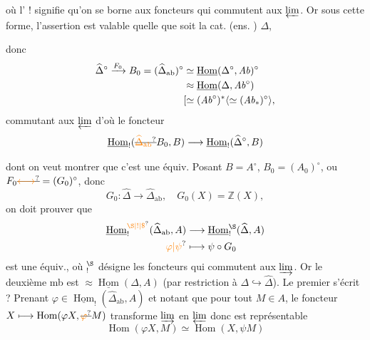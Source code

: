 où l' $!$ signifie qu'on se borne
aux foncteurs qui commutent aux $\varprojlim$.
Or sous cette forme, l'assertion est
valable quelle que soit la cat. (ens. )
$\Delta$, 


donc
\[
\begin{aligned}
\widehat\Delta^{\circ}\xrightarrow{F_0}B_0
=(\widehat\Delta_{\mathrm{ab}})^{\circ}
&\simeq\underline{\operatorname{Hom}}(\Delta^{\circ},\mathit{Ab})^{\circ}\\
&\approx\underline{\operatorname{Hom}}(\Delta,\mathit{Ab}^{\circ})\\
&[\simeq(\mathit{Ab}^{\circ})^{\ast}\inserted{\simeq(\mathit{Ab}_{\ast})^{\circ}},
\end{aligned}
\]
\inserted{dans le cas qui nous intéresse]} commutant aux $\varprojlim$
d'où le foncteur
\[
\underline{\operatorname{Hom}}_{!}(\deleted{\unsure{\widehat\Delta_{\mathrm{ab}}}}B_0,B)
\longrightarrow\underline{\operatorname{Hom}}_{!}(\widehat\Delta^{\circ},B)
\]

dont on veut montrer que c'est une équiv. Posant
$B=A^{\circ}$, $B_0=(A_0)^{\circ}$, ou $F_0\deleted{\unsure{\longleftrightarrow}}=(G_0)^{\circ}$, donc
\[
G_0:\widehat\Delta\longrightarrow\widehat\Delta_{\mathrm{ab}},\quad G_0(X)=\mathbb Z(X),
\]
on doit prouver que
\[
\begin{aligned}
\underline{\operatorname{Hom}}_{!}^{\unsure{\S|!|\$}}(\widehat\Delta_{\mathrm{ab}},A)&\longrightarrow
\underline{\operatorname{Hom}}_{!}^{\S}(\widehat\Delta,A)\\
\unsure{\varphi|\psi}&\longmapsto\psi\circ G_0
\end{aligned}
\]
est une équiv., où $ {}_{!}^{\S}$ désigne les foncteurs
qui commutent aux $\varinjlim$. Or
le deuxième mb est $\approx\underline{\operatorname{Hom}}(\Delta,A)$
(par restriction à $\Delta\hookrightarrow\widehat\Delta$).  Le
premier s'écrit ?  Prenant $\varphi\in\underline{\operatorname{Hom}}_{!}(\widehat\Delta_{\mathrm{ab}},A)$
et notant que pour tout $M\in A$,  le
foncteur $X\longmapsto\operatorname{Hom}(\varphi X,\deleted{\unsure{\varphi}}M)$ transforme $\varinjlim$
en $\varprojlim$ donc est représentable
\[
\operatorname{Hom}(\varphi X,M)\simeq\operatorname{Hom}(X,\psi M)
\]

